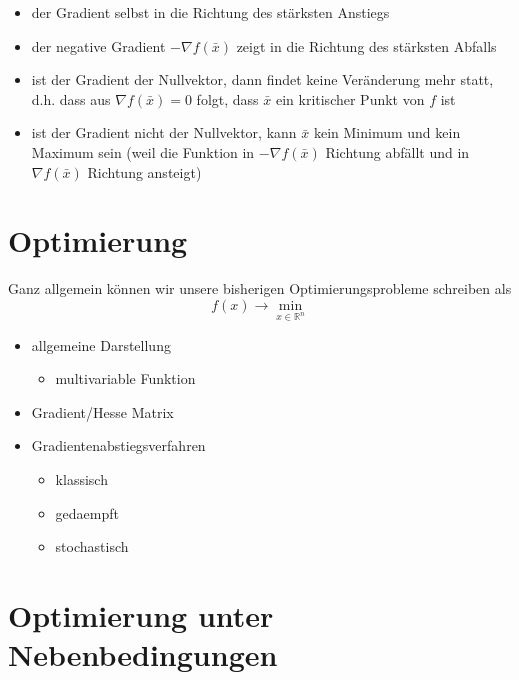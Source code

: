 \documentclass[]{book}
\providecommand{\tightlist}{%
  \setlength{\itemsep}{0pt}\setlength{\parskip}{0pt}}
\theoremstyle{definition}
\theoremstyle{definition}
\theoremstyle{definition}
\theoremstyle{definition}
\theoremstyle{remark}
\begin{document}
\begin{itemize}
\tightlist
\item
  der Gradient selbst in die Richtung des stärksten Anstiegs
\item
  der negative Gradient \(-\nabla f(\bar x)\) zeigt in die Richtung des stärksten Abfalls
\item
  ist der Gradient der Nullvektor, dann findet keine Veränderung mehr statt, d.h. dass aus \(\nabla f(\bar x) =0\) folgt, dass \(\bar x\) ein kritischer Punkt von \(f\) ist
\item
  ist der Gradient nicht der Nullvektor, kann \(\bar x\) kein Minimum und kein Maximum sein (weil die Funktion in \(-\nabla f(\bar x)\) Richtung abfällt und in \(\nabla f(\bar x)\) Richtung ansteigt)
\end{itemize}

\hypertarget{optimierung-1}{%
\section{Optimierung}\label{optimierung-1}}

Ganz allgemein können wir unsere bisherigen Optimierungsprobleme schreiben als
\begin{equation*}
f(x) \to \min_{x\in \mathbb R^{n}}
\end{equation*}

\begin{itemize}
\tightlist
\item
  allgemeine Darstellung

  \begin{itemize}
  \tightlist
  \item
    multivariable Funktion
  \end{itemize}
\item
  Gradient/Hesse Matrix
\item
  Gradientenabstiegsverfahren

  \begin{itemize}
  \tightlist
  \item
    klassisch
  \item
    gedaempft
  \item
    stochastisch
  \end{itemize}
\end{itemize}

\hypertarget{optimierung-unter-nebenbedingungen}{%
\section{Optimierung unter Nebenbedingungen}\label{optimierung-unter-nebenbedingungen}}
\end{document}

